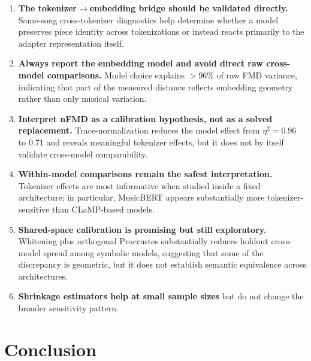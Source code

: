 \documentclass[a4paper]{article}
\begin{document}
\begin{enumerate}
    \item \textbf{The tokenizer$\rightarrow$embedding bridge should be validated directly.} Same-song cross-tokenizer diagnostics help determine whether a model preserves piece identity across tokenizations or instead reacts primarily to the adapter representation itself.
    \item \textbf{Always report the embedding model and avoid direct raw cross-model comparisons.} Model choice explains $>$96\% of raw FMD variance, indicating that part of the measured distance reflects embedding geometry rather than only musical variation.
    \item \textbf{Interpret nFMD as a calibration hypothesis, not as a solved replacement.} Trace-normalization reduces the model effect from $\eta^2 = 0.96$ to $0.71$ and reveals meaningful tokenizer effects, but it does not by itself validate cross-model comparability.
    \item \textbf{Within-model comparisons remain the safest interpretation.} Tokenizer effects are most informative when studied inside a fixed architecture; in particular, MusicBERT appears substantially more tokenizer-sensitive than CLaMP-based models.
    \item \textbf{Shared-space calibration is promising but still exploratory.} Whitening plus orthogonal Procrustes substantially reduces holdout cross-model spread among symbolic models, suggesting that some of the discrepancy is geometric, but it does not establish semantic equivalence across architectures.
    \item \textbf{Shrinkage estimators help at small sample sizes} but do not change the broader sensitivity pattern.
\end{enumerate}

\section{Conclusion}
\label{sec:conclusion}
\end{document}
